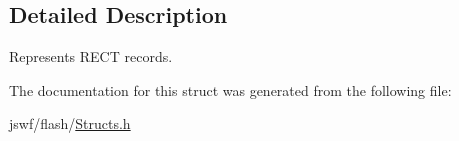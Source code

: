 \subsection{Detailed Description}
Represents {\ttfamily R\+E\+C\+T} records. 

The documentation for this struct was generated from the following file\+:\begin{DoxyCompactItemize}
\item 
jswf/flash/\hyperlink{_structs_8h}{Structs.\+h}\end{DoxyCompactItemize}
